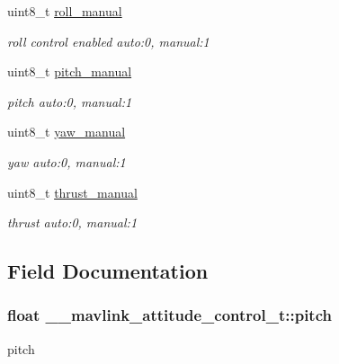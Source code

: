 \begin{DoxyCompactItemize}
uint8\+\_\+t \hyperlink{struct____mavlink__attitude__control__t_abd929bff95f4817ce4e08494e5914c1f}{roll\+\_\+manual}
\begin{DoxyCompactList}\small\item\em roll control enabled auto\+:0, manual\+:1 \end{DoxyCompactList}\item 
uint8\+\_\+t \hyperlink{struct____mavlink__attitude__control__t_a4906b5e07d2d4427e2eddcdd8abc14b8}{pitch\+\_\+manual}
\begin{DoxyCompactList}\small\item\em pitch auto\+:0, manual\+:1 \end{DoxyCompactList}\item 
uint8\+\_\+t \hyperlink{struct____mavlink__attitude__control__t_aa80ff21e28326a25526d12f5f98bc81b}{yaw\+\_\+manual}
\begin{DoxyCompactList}\small\item\em yaw auto\+:0, manual\+:1 \end{DoxyCompactList}\item 
uint8\+\_\+t \hyperlink{struct____mavlink__attitude__control__t_a6720f22b78ba78af87933d59827d2d0a}{thrust\+\_\+manual}
\begin{DoxyCompactList}\small\item\em thrust auto\+:0, manual\+:1 \end{DoxyCompactList}\end{DoxyCompactItemize}


\subsection{Field Documentation}
\hypertarget{struct____mavlink__attitude__control__t_a6b46edf966d790a711fb33c9b9117fed}{
\subsubsection[{pitch}]{\setlength{\rightskip}{0pt plus 5cm}float \+\_\+\+\_\+mavlink\+\_\+attitude\+\_\+control\+\_\+t\+::pitch}}\label{struct____mavlink__attitude__control__t_a6b46edf966d790a711fb33c9b9117fed}


pitch 

